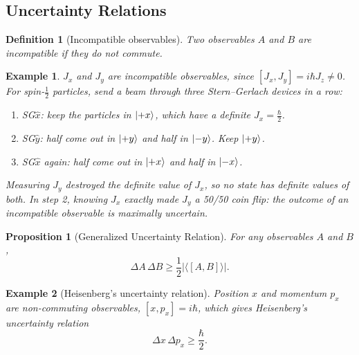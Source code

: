 \documentclass{article}
\newtheorem{definition}{Definition}
\newtheorem*{example}{Example}
\newtheorem{proposition}{Proposition}
\begin{document}
\subsection{Uncertainty Relations}
\begin{definition}[Incompatible observables]
    Two observables $A$ and $B$ are incompatible if they do not commute.
\end{definition}
\begin{example}
    $J_x$ and $J_y$ are incompatible observables, since $[J_x, J_y] = i\hbar J_z \neq 0$. For spin-$\frac{1}{2}$ particles, send a beam through three Stern--Gerlach devices in a row:
    \begin{enumerate}
        \item SG$\hat{x}$: keep the particles in $\ket{+x}$, which have a definite $J_x = \frac{\hbar}{2}$.
        \item SG$\hat{y}$: half come out in $\ket{+y}$ and half in $\ket{-y}$. Keep $\ket{+y}$.
        \item SG$\hat{x}$ again: half come out in $\ket{+x}$ and half in $\ket{-x}$.
    \end{enumerate}
    Measuring $J_y$ destroyed the definite value of $J_x$, so no state has definite values of both. In step 2, knowing $J_x$ exactly made $J_y$ a 50/50 coin flip: the outcome of an incompatible observable is maximally uncertain.
\end{example}
\begin{proposition}[Generalized Uncertainty Relation]
    For any observables $A$ and $B$,
    \begin{equation}
        \Delta A\,\Delta B \geq \frac{1}{2}\left|\langle[A,B]\rangle\right|.
    \end{equation}
\end{proposition}
\begin{example}[Heisenberg's uncertainty relation]
    Position $x$ and momentum $p_x$ are non-commuting observables, $[x,p_x] = i\hbar$, which gives Heisenberg's uncertainty relation
    \begin{equation}
        \label{eq:heisenberg}
        \Delta x\,\Delta p_x \geq \frac{\hbar}{2}.
    \end{equation}
\end{example}
\end{document}
